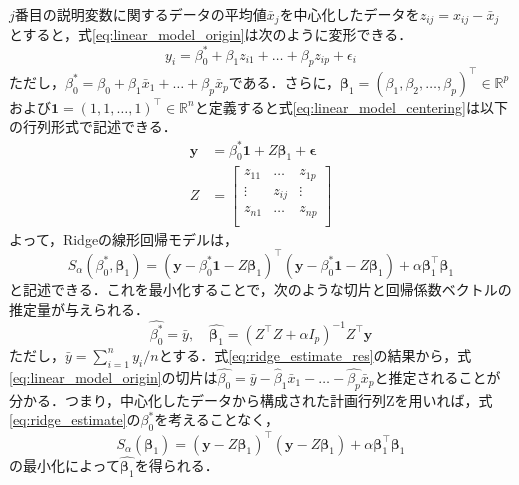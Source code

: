\documentclass[a4paper,twocolumn]{ujarticle} %
\begin{document}
$j$番目の説明変数に関するデータの平均値$\bar{x}_j$を中心化したデータを$z_{ij}=x_{ij} - \bar{x}_j$とすると，式\eqref{eq:linear_model_origin}は次のように変形できる．
\begin{equation}
        y_i = \beta_0^* + \beta_1 z_{i1} + \dots + \beta_p z_{ip} + \epsilon_i
	\label{eq:linear_model_centering}
\end{equation}
ただし，$\beta_0^* = \beta_0 + \beta_1 \bar{x}_{1} + \dots + \beta_p \bar{x}_{p}$である．さらに，$\bm{\beta}_1 = (\beta_1, \beta_2, \dots , \beta_p)^{\top} \in \mathbb{R}^p$および$ \bm{1} = (1, 1, \dots , 1)^{\top} \in \mathbb{R}^n$と定義すると式\eqref{eq:linear_model_centering}は以下の行列形式で記述できる．
\begin{equation}
	\begin{split}
		\bm{y} &= \beta_0^* \bm{1} + Z \bm{\beta}_1 + \bm{\epsilon}\\
		Z &= \left[
                \begin{array}{ccc}
                z_{11} & \dots & z_{1p} \\
                \vdots & z_{ij} & \vdots \\
                z_{n1} & \dots & z_{np} \\
                \end{array}
                \right]
        \end{split}
	\label{eq:linear_model_mat}
\end{equation}
よって，Ridgeの線形回帰モデルは，
\begin{equation}
	S_{\alpha}(\beta_0^* , \bm{\beta}_1) = (\bm{y} - \beta_0^* \bm{1} - Z \bm{\beta}_1)^{\top} (\bm{y} - \beta_0^* \bm{1} - Z \bm{\beta}_1) + \alpha \bm{\beta}_1^{\top} \bm{\beta}_1 
	\label{eq:ridge_estimate}
\end{equation}
と記述できる．これを最小化することで，次のような切片と回帰係数ベクトルの推定量が与えられる．
\begin{equation}
	\hat{\beta_0^*} = \bar{y}, \quad \hat{\bm{\beta}_1} = (Z^{\top}Z + \alpha I_p)^{-1} Z^{\top} \bm{y}
	\label{eq:ridge_estimate_res}
\end{equation}
ただし，$\bar{y}=\sum_{i=1}^{n}{y_i}/n$とする．式\eqref{eq:ridge_estimate_res}の結果から，式\eqref{eq:linear_model_origin}の切片は$\hat{\beta_0} = \bar{y} - \hat{\beta}_1 \bar{x}_1 - \dots - \hat{\beta_p} \bar{x}_p$と推定されることが分かる．つまり，中心化したデータから構成された計画行列Zを用いれば，式\eqref{eq:ridge_estimate}の$\beta_0^*$を考えることなく，
\begin{equation}
	S_{\alpha}(\bm{\beta}_1) = (\bm{y} - Z \bm{\beta}_1)^{\top}  (\bm{y} - Z\bm{\beta}_1) + \alpha \bm{\beta}_1^{\top} \bm{\beta}_1
	\label{eq:ridge_estimate_beta1hat}
\end{equation}
の最小化によって$\hat{\bm{\beta}_1}$を得られる．
\end{document}
